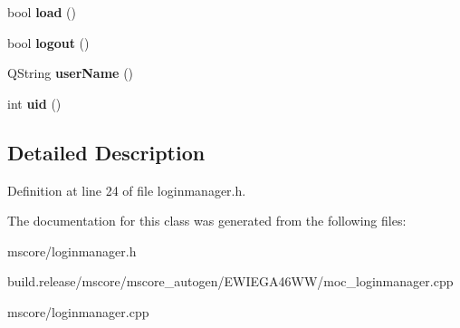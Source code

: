 \begin{DoxyCompactItemize}
bool {\bfseries load} ()
\item 
\mbox{\label{class_ms_1_1_login_manager_a40b0c80d46d67932df12ce1b2b44ee9b}} 
bool {\bfseries logout} ()
\item 
\mbox{\label{class_ms_1_1_login_manager_a9ae142bf61677f8105f95e88ab76b4ff}} 
Q\+String {\bfseries user\+Name} ()
\item 
\mbox{\label{class_ms_1_1_login_manager_a0a65864590c95ea50cd49d49cedaa56c}} 
int {\bfseries uid} ()
\end{DoxyCompactItemize}


\subsection{Detailed Description}


Definition at line 24 of file loginmanager.\+h.



The documentation for this class was generated from the following files\+:\begin{DoxyCompactItemize}
\item 
mscore/loginmanager.\+h\item 
build.\+release/mscore/mscore\+\_\+autogen/\+E\+W\+I\+E\+G\+A46\+W\+W/moc\+\_\+loginmanager.\+cpp\item 
mscore/loginmanager.\+cpp\end{DoxyCompactItemize}
